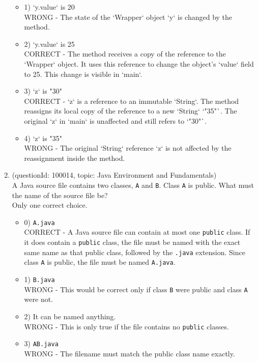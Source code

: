 \documentclass[12pt]{article}
\begin{document}
\begin{enumerate}[label=(\arabic*)]
\begin{itemize}
\item 1) `y.value` is 20
 \\ 
WRONG - The state of the `Wrapper` object `y` is changed by the method.

\item 2) `y.value` is 25
 \\ 
CORRECT - The method receives a copy of the reference to the `Wrapper` object. It uses this reference to change the object's `value` field to 25. This change is visible in `main`.

\item 3) `z` is "30"
 \\ 
CORRECT - `z` is a reference to an immutable `String`. The method reassigns its local copy of the reference to a new `String` `"35"`. The original `z` in `main` is unaffected and still refers to `"30"`.

\item 4) `z` is "35"
 \\ 
WRONG - The original `String` reference `z` is not affected by the reassignment inside the method.

\end{itemize}
\item (questionId: 100014, topic: Java Environment and Fundamentals) \\ 
A Java source file contains two classes, \verb|A| and \verb|B|. Class \verb|A| is public. What must the name of the source file be?
\\ \noindent Only one correct choice. 
\begin{itemize}
\item 0) \verb|A.java|
 \\ 
CORRECT - A Java source file can contain at most one \verb|public| class. If it does contain a \verb|public| class, the file must be named with the exact same name as that public class, followed by the \verb|.java| extension. Since class \verb|A| is public, the file must be named \verb|A.java|.

\item 1) \verb|B.java|
 \\ 
WRONG - This would be correct only if class \verb|B| were public and class \verb|A| were not.

\item 2) It can be named anything.
 \\ 
WRONG - This is only true if the file contains no \verb|public| classes.

\item 3) \verb|AB.java|
 \\ 
WRONG - The filename must match the public class name exactly.


\end{itemize}
\end{enumerate}
\end{document}
